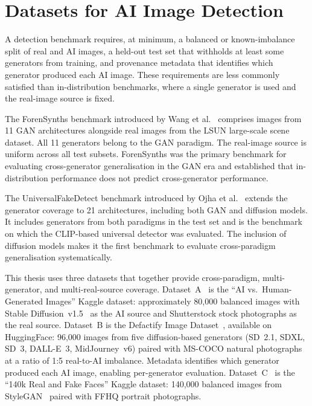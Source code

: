 
\section{Datasets for AI Image Detection}
\label{sec:detection_datasets}

A detection benchmark requires, at minimum, a balanced or known-imbalance split of real
and AI images, a held-out test set that withholds at least some generators from training,
and provenance metadata that identifies which generator produced each AI image. These
requirements are less commonly satisfied than in-distribution benchmarks, where a single
generator is used and the real-image source is fixed.

The ForenSynths benchmark introduced by Wang et al.~\cite{wang2020} comprises images
from 11 GAN architectures alongside real images from the LSUN large-scale scene dataset.
All 11 generators belong to the GAN paradigm. The real-image source is uniform across
all test subsets. ForenSynths was the primary benchmark for evaluating cross-generator
generalisation in the GAN era and established that in-distribution performance does not
predict cross-generator performance.

The UniversalFakeDetect benchmark introduced by Ojha et al.~\cite{ojha2023} extends the
generator coverage to 21 architectures, including both GAN and diffusion models. It
includes generators from both paradigms in the test set and is the benchmark on which
the CLIP-based universal detector was evaluated. The inclusion of diffusion models makes
it the first benchmark to evaluate cross-paradigm generalisation systematically.

This thesis uses three datasets that together provide cross-paradigm, multi-generator,
and multi-real-source coverage. Dataset~A~\cite{datasetA_kaggle} is the ``AI vs.\
Human-Generated Images'' Kaggle dataset: approximately 80,000 balanced images with Stable
Diffusion~v1.5~\cite{rombach2022} as the AI source and Shutterstock stock photographs as the real source.
Dataset~B is the Defactify Image Dataset~\cite{roy2025defactify}, available on HuggingFace: 96,000 images from
five diffusion-based generators (SD~2.1, SDXL, SD~3, DALL-E~3, MidJourney~v6) paired
with MS-COCO natural photographs at a ratio of 1:5 real-to-AI imbalance. Metadata identifies
which generator produced each AI image, enabling per-generator evaluation. Dataset~C~\cite{datasetC_kaggle}
is the ``140k Real and Fake Faces'' Kaggle dataset: 140,000 balanced images from
StyleGAN~\cite{karras2019} paired with FFHQ portrait photographs.

